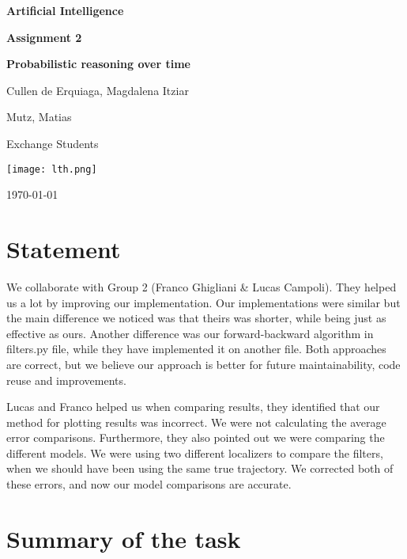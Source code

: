 \documentclass{article}
\begin{document}
\begin{titlepage}
    \centering
    \vspace*{1.5cm}
    {\LARGE\bfseries Artificial Intelligence\par}
    \vspace*{0.5cm}
    {\LARGE\bfseries Assignment 2\par}
    \vspace*{0.5cm}
    {\LARGE\bfseries Probabilistic reasoning over time\par}
    \vspace{1cm}
    {\Large Cullen de Erquiaga, Magdalena Itziar\par}
    \vspace{0.5cm}
    {\Large Mutz, Matias\par}
    \vspace{1cm}
    {\large Exchange Students\par}
    \vspace{2cm}
    \texttt{[image: lth.png]}
    \vfill
    {\large \today\par}
\end{titlepage}

\tableofcontents
\newpage

\section*{Statement}
\indent

We collaborate with Group 2 (Franco Ghigliani \& Lucas Campoli). They helped us a lot by improving our implementation. Our implementations were similar but the main difference we noticed was that theirs was shorter, while being just as effective as ours. Another difference was our forward-backward algorithm in filters.py file, while they have implemented it on another file. Both approaches are correct, but we believe our approach is better for future maintainability, code reuse and improvements.

Lucas and Franco helped us when comparing results, they identified that our method for plotting results was incorrect. We were not calculating the average error comparisons. Furthermore, they also pointed out we were comparing the different models.  We were using two different localizers to compare the filters, when we should have been using the same true trajectory. We corrected both of these errors, and now our model comparisons are accurate.

\section*{Summary of the task}
\indent
\end{document}

